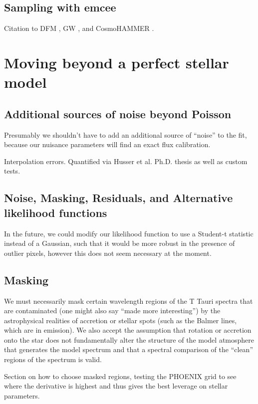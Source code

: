 \documentclass[preprint]{aastex} %
\begin{document}
\subsection{Sampling with emcee}
Citation to DFM \citep{fhl+12}, GW \citep{gw10}, and CosmoHAMMER \citep{asa+13}.


\section{Moving beyond a perfect stellar model}
\label{sec:residuals}


\subsection{Additional sources of noise beyond Poisson}
Presumably we shouldn't have to add an additional source of ``noise'' to the fit, because our nuisance parameters will find an exact flux calibration.

Interpolation errors. Quantified via Husser et al. Ph.D. thesis as well as custom tests.

\subsection{Noise, Masking, Residuals, and Alternative likelihood functions}
In the future, we could modify our likelihood function to use a Student-t statistic instead of a Gaussian, such that it would be more robust in the presence of outlier pixels, however this does not seem necessary at the moment. 

\subsection{Masking}

We must necessarily mask certain wavelength regions of the T Tauri spectra that are contaminated (one might also say ``made more interesting'') by the astrophysical realities of accretion or stellar spots (such as the Balmer lines, which are in emission).  We also accept the assumption that rotation or accretion onto the star does not fundamentally alter the structure of the model atmosphere that generates the model spectrum and that a spectral comparison of the ``clean'' regions of the spectrum is valid.

Section on how to choose masked regions, testing the PHOENIX grid to see where the derivative is highest and thus gives the best leverage on stellar parameters.
\end{document}
